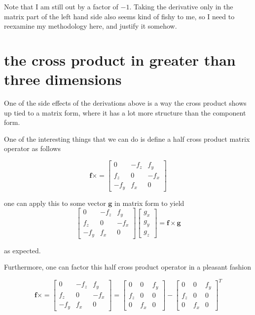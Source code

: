 \documentclass{article}      %
\newcommand{\Bf}[0]{\mathbf{f}}
\newcommand{\Bg}[0]{\mathbf{g}}
\newcommand{\cross}[0]{\times}
\begin{document}
Note that I am still out by a factor of $-1$.
Taking the derivative only in
the matrix part of the left hand side also seems kind of fishy to me, so I need to reexamine
my methodology here, and justify it somehow.

\section{the cross product in greater than three dimensions}

One of the side effects of the derivations above is a way the cross product shows up
tied
to a
matrix form, where it has a lot more structure than the component form.

One of the interesting things that we can do is define a half cross product matrix operator as follows

\begin{equation*}
\Bf \cross =
\begin{bmatrix}
0 & -f_z & f_y \\
f_z & 0 & -f_x \\
-f_y & f_x & 0
\end{bmatrix}
\end{equation*}

one can apply this to some vector $\Bg$ in matrix form to yield
\begin{equation*}
\begin{bmatrix}
0 & -f_z & f_y \\
f_z & 0 & -f_x \\
-f_y & f_x & 0
\end{bmatrix}
\begin{bmatrix}
g_x \\
g_y \\
g_z
\end{bmatrix}
= \Bf \cross \Bg
\end{equation*}

as expected.

Furthermore, one can factor this half cross product operator in a pleasant fashion

\begin{equation*}
\Bf \cross =
\begin{bmatrix}
0 & -f_z & f_y \\
f_z & 0 & -f_x \\
-f_y & f_x & 0
\end{bmatrix}
=
\begin{bmatrix}
0 & 0 & f_y \\
f_z & 0 & 0 \\
0 & f_x & 0
\end{bmatrix}
-
\begin{bmatrix}
0 & 0 & f_y \\
f_z & 0 & 0 \\
0 & f_x & 0
\end{bmatrix}^T
\end{equation*}
\end{document}

